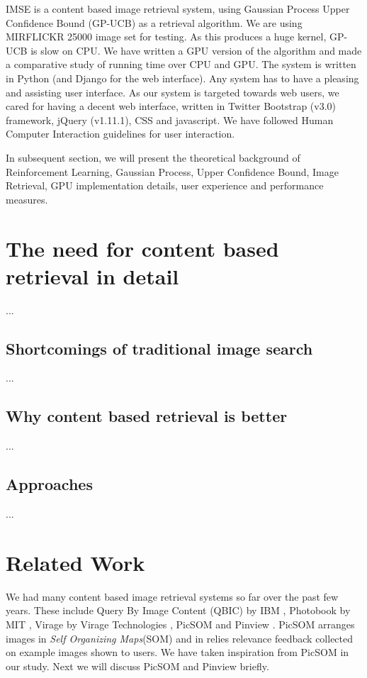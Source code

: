 \documentclass[english]{tktltiki}
\begin{document}
IMSE is a content based image retrieval system, using Gaussian Process Upper Confidence Bound (GP-UCB) as a retrieval algorithm. We are using MIRFLICKR 25000 \cite{mirflickr} image set for testing. As this produces a huge kernel, GP-UCB is slow on CPU. We have written a GPU version of the algorithm and made a comparative study of running time over CPU and GPU. The system is written in Python (and Django for the web interface). Any system has to have a pleasing and assisting user interface. As our system is targeted towards web users, we cared for having a decent web interface, written in Twitter Bootstrap (v3.0) framework, jQuery (v1.11.1), CSS and javascript. We have followed Human Computer Interaction guidelines for user interaction.

In subsequent section, we will present the theoretical background of Reinforcement Learning, Gaussian Process, Upper Confidence Bound, Image Retrieval, GPU implementation details, user experience and performance measures.


\section{The need for content based retrieval in detail}

...

\subsection{Shortcomings of traditional image search}

...

\subsection{Why content based retrieval is better}


...


\subsection{Approaches}

...

\fi


\section{Related Work}

We had many content based image retrieval systems so far over the past few years. These include Query By Image Content (QBIC) by IBM \cite{QBIC}, Photobook by MIT \cite{Photobook}, Virage by Virage Technologies \cite{Virage}, PicSOM \cite{PicSOM} and Pinview \cite{Pinview}. PicSOM arranges images in \textit{Self Organizing Maps}(SOM) \cite{SOM} and in relies relevance feedback collected on example images shown to users. We have taken inspiration from PicSOM in our study. Next we will discuss PicSOM and Pinview briefly.
\end{document}
